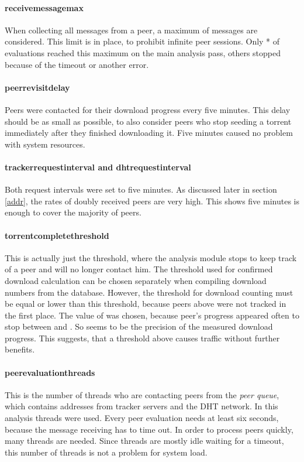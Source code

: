 \documentclass[10pt, a4paper, twoside, headsepline]{scrbook}
\renewcommand{\_}{\origunderscore\allowbreak}
\begin{document}
\paragraph{receive\_message\_max}
When collecting all messages from a peer, a maximum of  messages are considered. This limit is in place, to prohibit infinite peer sessions. Only * of evaluations reached this maximum on the main analysis pass, others stopped because of the timeout or another error.

\paragraph{peer\_revisit\_delay}
Peers were contacted for their download progress every five minutes. This delay should be as small as possible, to also consider peers who stop seeding a torrent immediately after they finished downloading it. Five minutes caused no problem with system resources.

\paragraph{tracker\_request\_interval and dht\_request\_interval}
Both request intervals were set to five minutes. As discussed later in section \ref{addr}, the rates of doubly received peers are very high. This shows five minutes is enough to cover the majority of peers.

\paragraph{torrent\_complete\_threshold}
This is actually just the threshold, where the analysis module stops to keep track of a peer and will no longer contact him. The threshold used for confirmed download calculation can be chosen separately when compiling download numbers from the database. However, the threshold for download counting must be equal or lower than this threshold, because peers above were not tracked in the first place. The value of  was chosen, because peer's progress appeared often to stop between  and . So  seems to be the precision of the measured download progress. This suggests, that a threshold above  causes traffic without further benefits.

\paragraph{peer\_evaluation\_threads}
This is the number of threads who are contacting peers from the \emph{peer queue}, which contains addresses from tracker servers and the DHT network. In this analysis  threads were used. Every peer evaluation needs at least six seconds, because the message receiving has to time out. In order to process peers quickly, many threads are needed. Since threads are mostly idle waiting for a timeout, this number of threads is not a problem for system load.
\end{document}
